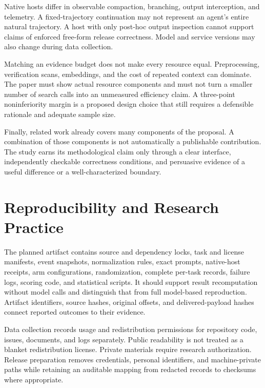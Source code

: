 Native hosts differ in observable compaction, branching, output
interception, and telemetry. A fixed-trajectory continuation may not
represent an agent's entire natural trajectory. A host with only
post-hoc output inspection cannot support claims of enforced free-form
release correctness. Model and service versions may also change during
data collection.

Matching an evidence budget does not make every resource equal.
Preprocessing, verification scans, embeddings, and the cost of repeated
context can dominate. The paper must show actual resource components and
must not turn a smaller number of search calls into an unmeasured
efficiency claim. A three-point noninferiority margin is a proposed
design choice that still requires a defensible rationale and adequate
sample size.

Finally, related work already covers many components of the proposal. A
combination of those components is not automatically a publishable
contribution. The study earns its methodological claim only through a
clear interface, independently checkable correctness conditions, and
persuasive evidence of a useful difference or a well-characterized
boundary.

\section{Reproducibility and Research
Practice}\label{reproducibility-and-research-practice}

The planned artifact contains source and dependency locks, task and
license manifests, event snapshots, normalization rules, exact prompts,
native-host receipts, arm configurations, randomization, complete
per-task records, failure logs, scoring code, and statistical scripts.
It should support result recomputation without model calls and
distinguish that from full model-based reproduction. Artifact
identifiers, source hashes, original offsets, and delivered-payload
hashes connect reported outcomes to their evidence.

Data collection records usage and redistribution permissions for
repository code, issues, documents, and logs separately. Public
readability is not treated as a blanket redistribution license. Private
materials require research authorization. Release preparation removes
credentials, personal identifiers, and machine-private paths while
retaining an auditable mapping from redacted records to checksums where
appropriate.

